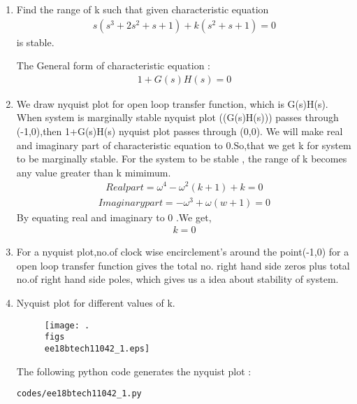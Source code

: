 \begin{enumerate}[label=\thesection.\arabic*.,ref=\thesection.\theenumi]
\item Find the range of k such that given characteristic equation
\begin{align}
s(s^3+2s^2+s+1) +k(s^2+s+1) = 0
\label{eq:ee18btech11042_1}
\end{align}
is stable.

\solution
The General form of characteristic equation :
\begin{align}
1+G(s)H(s) = 0
\label{eq:ee18btech11042_2}    
\end{align}
\item  We draw nyquist plot for open loop transfer function, which is G(s)H(s). When system is marginally stable nyquist plot ((G(s)H(s))) passes through (-1,0),then 1+G(s)H(s) nyquist plot passes through (0,0). We will make real and imaginary part of characteristic equation to 0.So,that  we  get  k for system to be  marginally stable. For the system to be stable , the range of k becomes any value greater than k mimimum.
\begin{align}
Real part = \omega^4 - \omega^2(k+1) +k = 0
\label{eq:ee18btech11042_3}
\end{align}
\begin{align}
Imaginary part = -\omega^3 +\omega(w+1) = 0
\label{eq:ee18btech11042_4}
\end{align}
By equating real and imaginary to 0 .We get,
\begin{align}
 k = 0
\label{eq:ee18btech11042_5}
\end{align}

\item For a nyquist plot,no.of clock wise encirclement's around the point(-1,0) for a open loop transfer function gives the total no. right hand side  zeros plus total no.of right hand side poles, which gives us a idea about stability of system.
\item   Nyquist plot for different values of k.

\begin{figure}[!h]
  \texttt{[image: .\\figs\\ee18btech11042\_1.eps]}
  \label{fig:ee18btech11042_1.eps}
\end{figure}
 

\center The following python code generates the nyquist plot : 
\begin{lstlisting}
codes/ee18btech11042_1.py
\end{lstlisting}



\end{enumerate}

